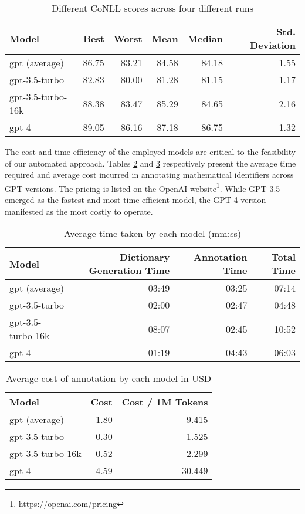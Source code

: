 \begin{table}[htpb]
  \centering
  \begin{tabular}{lrrrrr}
    \hline
    Model & Best & Worst & Mean & Median & Std. Deviation \\
    \hline
    gpt (average) & 86.75 & 83.21 & 84.58 & 84.18 & 1.55 \\
    gpt-3.5-turbo & 82.83 & 80.00 & 81.28 & 81.15 & 1.17 \\
    gpt-3.5-turbo-16k & 88.38 & 83.47 & 85.29 & 84.65 & 2.16 \\
    gpt-4 & 89.05 & 86.16 & 87.18 & 86.75 & 1.32 \\
    \hline
  \end{tabular}
  \caption[Statistics of variance]{Different CoNLL scores across four different runs}
  \label{tab:variance}
\end{table}

The cost and time efficiency of the employed models are critical to the feasibility of our automated approach. Tables \ref{tab:time} and \ref{tab:cost} respectively present the average time required and average cost incurred in annotating mathematical identifiers across GPT versions. The pricing is listed on the OpenAI website\footnote{\url{https://openai.com/pricing}}. While GPT-3.5 emerged as the fastest and most time-efficient model, the GPT-4 version manifested as the most costly to operate.

\begin{table}[htpb]
  \centering
  \begin{tabular}{lrrr}
    \hline
    Model & Dictionary Generation Time & Annotation Time & Total Time \\
    \hline
    gpt (average) & 03:49 & 03:25 & 07:14 \\
    gpt-3.5-turbo & 02:00 & 02:47 & 04:48 \\
    gpt-3.5-turbo-16k & 08:07 & 02:45 & 10:52 \\
    gpt-4 & 01:19 & 04:43 & 06:03 \\
    \hline
  \end{tabular}
  \caption[Average time taken]{Average time taken by each model (mm:ss)}
  \label{tab:time}
\end{table}

\begin{table}[htpb]
  \centering
  \begin{tabular}{lrr}
    \hline
    Model & Cost & Cost / 1M Tokens \\
    \hline
    gpt (average) & 1.80 & 9.415 \\
    gpt-3.5-turbo & 0.30 & 1.525 \\
    gpt-3.5-turbo-16k & 0.52 & 2.299 \\
    gpt-4 & 4.59 & 30.449 \\
    \hline
  \end{tabular}
  \caption[Cost Analysis]{Average cost of annotation by each model in USD}
  \label{tab:cost}
\end{table}


